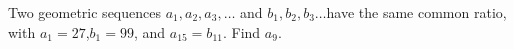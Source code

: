 Two geometric sequences $ a_1,a_2,a_3,\ldots$ and $b_1,b_2,b_3\ldots $have the same common ratio, with $a_1=27$,$b_1=99$, and $a_{15}=b_{11}$. Find $a_9.$
